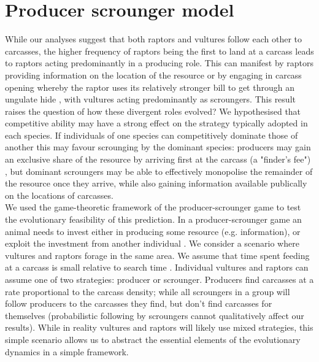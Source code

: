 
\section{\uppercase{P}roducer scrounger model}

While our analyses suggest that both raptors and vultures follow each other to carcasses, the higher frequency of raptors being the first to land at a carcass leads to raptors acting predominantly in a producing role. This can manifest by raptors providing information on the location of the resource or by engaging in carcass opening whereby the raptor uses its relatively stronger bill to get through an ungulate hide \citep{kendall2013alternative}, with vultures acting predominantly as scroungers. This result raises the question of how these divergent roles evolved? We hypothesised that competitive ability may have a strong effect on the strategy typically adopted in each species. If individuals of one species can competitively dominate those of another this may favour scrounging by the dominant species: producers may gain an exclusive share of the resource by arriving first at the carcass (a "finder's fee") \citep{vickery1991producers}, but dominant scroungers may be able to effectively monopolise the remainder of the resource once they arrive, while also gaining information available publically on the locations of carcasses. \\
\indent
We used the game-theoretic framework of the producer-scrounger game to test the evolutionary feasibility of this prediction. In a producer-scrounger game an animal needs to invest either in producing some resource (e.g. information), or exploit the investment from another individual \citep{morand2010learning}. We consider a scenario where vultures and raptors forage in the same area. We assume that time spent feeding at a carcass is small relative to search time \citep{mundy1992vultures,barta1998effect}. Individual vultures and raptors can assume one of two strategies: producer or scrounger. Producers find carcasses at a rate proportional to the carcass density; while all scroungers in a group will follow producers to the carcasses they find, but don't find carcasses for themselves (probabilistic following by scroungers cannot qualitatively affect our results). While in reality vultures and raptors will likely use mixed strategies, this simple scenario allows us to abstract the essential elements of the evolutionary dynamics in a simple framework.

